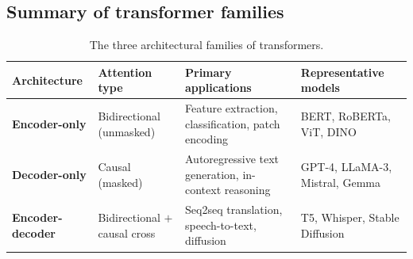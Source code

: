 \documentclass[11pt,a4paper]{article}
\theoremstyle{definition}
\theoremstyle{plain}
\begin{document}
\subsection{Summary of transformer families}
\begin{table}[H]
\centering\small
\renewcommand{\arraystretch}{1.25}
\begin{tabular}{@{}p{2.6cm}p{3.4cm}p{4.7cm}p{3.9cm}@{}}
\toprule
\textbf{Architecture} & \textbf{Attention type} & \textbf{Primary applications} & \textbf{Representative models} \\
\midrule
\textbf{Encoder-only} & Bidirectional (unmasked) & Feature extraction, classification, patch encoding & BERT, RoBERTa, ViT, DINO \\
\textbf{Decoder-only} & Causal (masked) & Autoregressive text generation, in-context reasoning & GPT-4, LLaMA-3, Mistral, Gemma \\
\textbf{Encoder-decoder} & Bidirectional $+$ causal cross & Seq2seq translation, speech-to-text, diffusion & T5, Whisper, Stable Diffusion \\
\bottomrule
\end{tabular}
\caption{The three architectural families of transformers.}\label{tab:arch_families}
\end{table}
\end{document}
